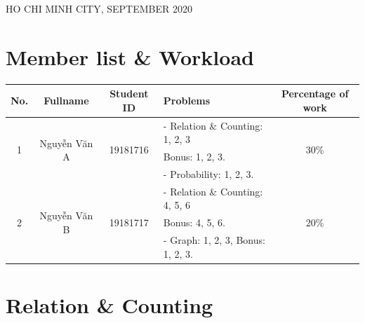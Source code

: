 \documentclass[a4paper]{article}
\begin{document}
\begin{titlepage}
  \begin{center}
    {\footnotesize HO CHI MINH CITY, SEPTEMBER 2020}
  \end{center}
\end{titlepage}



\newpage
\tableofcontents
\newpage


\section{Member list \& Workload}

\begin{center}
  \begin{tabular}{|c|c|c|l|c|}
    \hline
    \textbf{No.}       & \textbf{Fullname}             & \textbf{Student ID}       & \textbf{Problems}                 & \textbf{Percentage of work} \\
    \hline
    \multirow{3}{*}{1} & \multirow{3}{*}{Nguyễn Văn A} & \multirow{3}{*}{19181716} & - Relation \& Counting: 1, 2, 3   & \multirow{3}{*}{30\%}       \\
                       &                               &                           & Bonus: 1, 2, 3.                   &                             \\
                       &                               &                           & - Probability: 1, 2, 3.           &                             \\
    \hline
    \multirow{3}{*}{2} & \multirow{3}{*}{Nguyễn Văn B} & \multirow{3}{*}{19181717} & - Relation \& Counting: 4, 5, 6   & \multirow{3}{*}{20\%}       \\
                       &                               &                           & Bonus: 4, 5, 6.                   &                             \\
                       &                               &                           & - Graph: 1, 2, 3, Bonus: 1, 2, 3. &                             \\
    \hline
  \end{tabular}
\end{center}

\section{Relation \& Counting}
\end{document}
